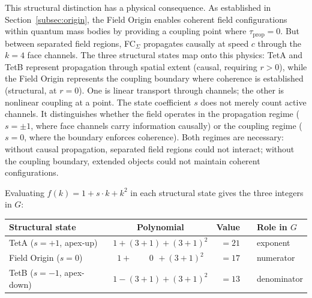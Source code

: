 \documentclass[aps,prd,preprint,superscriptaddress,showpacs,preprintnumbers,amsmath,amssymb,nofootinbib]{revtex4-2}
\begin{document}
This structural distinction has a physical consequence. As established in Section~\ref{subsec:origin}, the Field Origin enables coherent field configurations within quantum mass bodies by providing a coupling point where $\tau_{\text{prop}} = 0$. But between separated field regions, FC$_{\Sigma}$ propagates causally at speed $c$ through the $k = 4$ face channels. The three structural states map onto this physics: TetA and TetB represent propagation through spatial extent (causal, requiring $r > 0$), while the Field Origin represents the coupling boundary where coherence is established (structural, at $r = 0$). One is linear transport through channels; the other is nonlinear coupling at a point. The state coefficient $s$ does not merely count active channels. It distinguishes whether the field operates in the propagation regime ($s = \pm 1$, where face channels carry information causally) or the coupling regime ($s = 0$, where the boundary enforces coherence). Both regimes are necessary: without causal propagation, separated field regions could not interact; without the coupling boundary, extended objects could not maintain coherent configurations.

Evaluating $f(k) = 1 + s \cdot k + k^2$ in each structural state gives the three integers in $G$:

\begin{center}
\renewcommand{\arraystretch}{1.4}
\begin{tabular*}{\textwidth}{@{\extracolsep{\fill}} lcrcl}
\hline
\textbf{Structural state} & \textbf{Polynomial} & \textbf{Value} & & \textbf{Role in $G$} \\
\hline
TetA ($s = +1$, apex-up) & $1 + (3{+}1) + (3{+}1)^2$ & $= 21$ & & exponent \\
Field Origin ($s = 0$) & $1 + \phantom{(3{+}}0\phantom{)} + (3{+}1)^2$ & $= 17$ & & numerator \\
TetB ($s = -1$, apex-down) & $1 - (3{+}1) + (3{+}1)^2$ & $= 13$ & & denominator \\
\hline
\end{tabular*}
\end{center}
\end{document}
